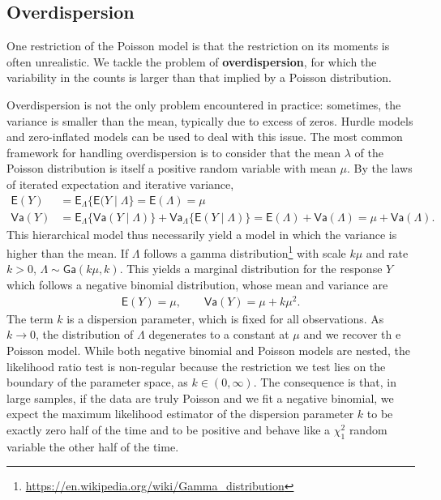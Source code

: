 \documentclass[
  11pt,
  letterpaper,
]{book}
\renewcommand{\href}[2]{#2\footnote{\url{#1}}}
\theoremstyle{definition}
\theoremstyle{definition}
\theoremstyle{definition}
\theoremstyle{remark}
\begin{document}
\hypertarget{overdispersion}{%
\subsection{Overdispersion}\label{overdispersion}}

One restriction of the Poisson model is that the restriction on its moments is often unrealistic. We tackle the problem of \textbf{overdispersion}, for which the variability in the counts is larger than that implied by a Poisson distribution.

Overdispersion is not the only problem encountered in practice: sometimes, the variance is smaller than the mean, typically due to excess of zeros. Hurdle models and zero-inflated models can be used to deal with this issue. The most common framework for handling overdispersion is to consider that the mean \(\lambda\) of the Poisson distribution is itself a positive random variable with mean \(\mu\). By the laws of iterated expectation and iterative variance,
\begin{align*}
\mathsf{E}(Y) &= \mathsf{E}_{\Lambda}\{\mathsf{E}(Y \mid \Lambda\} = \mathsf{E}(\Lambda) = \mu\\
\mathsf{Va}(Y) &= \mathsf{E}_{\Lambda}\{\mathsf{Va}(Y \mid \Lambda)\} + \mathsf{Va}_{\Lambda}\{\mathsf{E}(Y \mid \Lambda)\} = \mathsf{E}(\Lambda) + \mathsf{Va}(\Lambda) = \mu + \mathsf{Va}(\Lambda).
\end{align*}
This hierarchical model thus necessarily yield a model in which the variance is higher than the mean. If \(\Lambda\) follows a \href{https://en.wikipedia.org/wiki/Gamma_distribution}{gamma distribution} with scale \(k\mu\) and rate \(k>0\), \(\Lambda \sim \mathsf{Ga}(k\mu, k)\). This yields a marginal distribution for the response \(Y\) which follows a negative binomial distribution, whose mean and variance are
\begin{align*}
\mathsf{E}(Y) = \mu, \qquad \mathsf{Va}(Y) = \mu + k \mu^2.
\end{align*}
The term \(k\) is a dispersion parameter, which is fixed for all observations. As \(k \to 0\), the distribution of \(\Lambda\) degenerates to a constant at \(\mu\) and we recover th e Poisson model. While both negative binomial and Poisson models are nested, the likelihood ratio test is non-regular because the restriction we test lies on the boundary of the parameter space, as \(k \in (0, \infty)\). The consequence is that, in large samples, if the data are truly Poisson and we fit a negative binomial, we expect the maximum likelihood estimator of the dispersion parameter \(k\) to be exactly zero half of the time and
to be positive and behave like a \(\chi_1^2\) random variable the other half of the time.
\end{document}
